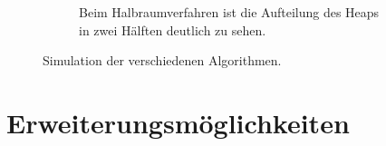 \begin{figure}[p]
\begin{subfigure}{\textwidth}
		\caption{Beim Halbraumverfahren ist die Aufteilung des Heaps in zwei Hälften deutlich zu sehen.}
	\end{subfigure}
	\caption[Simulation der verschiedenen Algorithmen]{Simulation der verschiedenen Algorithmen.}
	\label{fig:simulation}
\end{figure}

\section{Erweiterungsmöglichkeiten}
\label{sec:extension}

